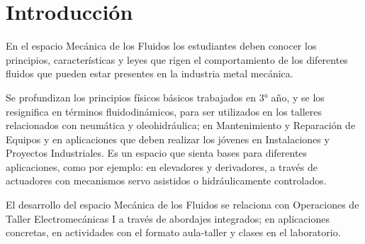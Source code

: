 \documentclass[../main]{subfiles}
\begin{document}
\section*{Introducción}
En el espacio Mecánica de los Fluidos los estudiantes deben conocer
los principios,
características y leyes que rigen el comportamiento de los diferentes
fluidos que
pueden estar presentes en la industria metal mecánica.

Se profundizan los principios físicos básicos trabajados en 3° año, y
se los resignifica
en términos fluidodinámicos, para ser utilizados en los talleres
relacionados con
neumática y oleohidráulica; en Mantenimiento y Reparación de Equipos y en
aplicaciones que deben realizar los jóvenes en Instalaciones y
Proyectos Industriales.
Es un espacio que sienta bases para diferentes aplicaciones, como por
ejemplo: en
elevadores y derivadores, a través de actuadores con mecanismos servo
asistidos o
hidráulicamente controlados.

El desarrollo del espacio Mecánica de los Fluidos se relaciona con Operaciones
de Taller Electromecánicas I a través de abordajes integrados; en aplicaciones
concretas, en actividades con el formato aula-taller y clases en el laboratorio.
\end{document}
